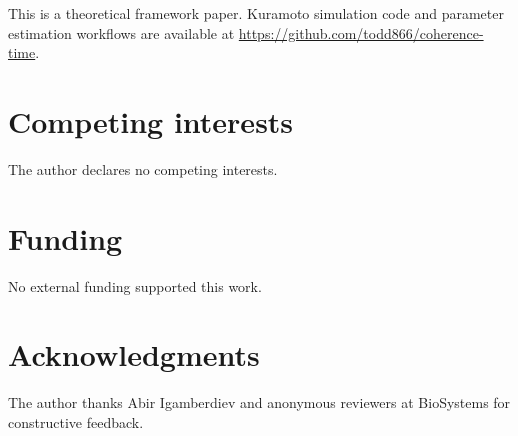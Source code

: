 \documentclass[12pt]{article}
\begin{document}
This is a theoretical framework paper. Kuramoto simulation code and parameter estimation workflows are available at \url{https://github.com/todd866/coherence-time}.

\section*{Competing interests}

The author declares no competing interests.

\section*{Funding}

No external funding supported this work.

\section*{Acknowledgments}

The author thanks Abir Igamberdiev and anonymous reviewers at BioSystems for constructive feedback.
\end{document}
